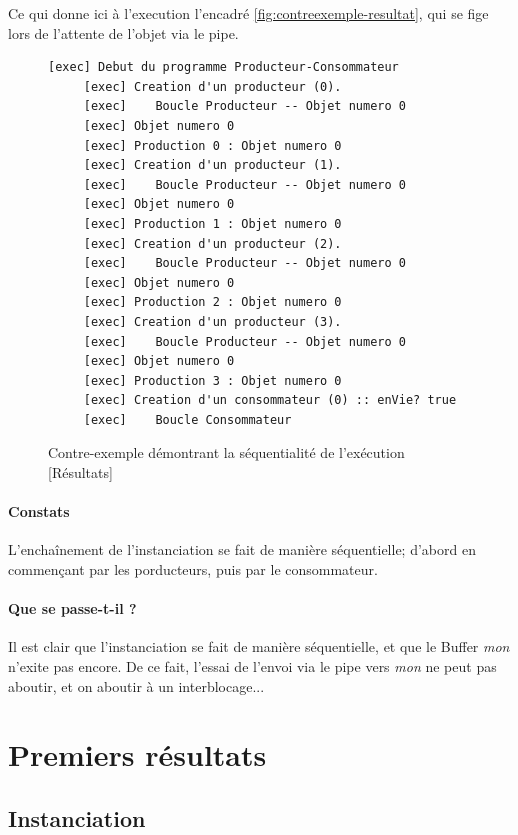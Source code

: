 \documentclass[a4paper,11pt,french]{report}
\begin{document}
Ce qui donne ici à l'execution l'encadré \vref{fig:contreexemple-resultat}, qui se fige lors de l'attente de l'objet via le pipe.

\begin{figure}[h]
\begin{lstlisting}[frame=trBL]
     [exec] Debut du programme Producteur-Consommateur
     [exec] Creation d'un producteur (0).
     [exec]    Boucle Producteur -- Objet numero 0
     [exec] Objet numero 0
     [exec] Production 0 : Objet numero 0
     [exec] Creation d'un producteur (1).
     [exec]    Boucle Producteur -- Objet numero 0
     [exec] Objet numero 0
     [exec] Production 1 : Objet numero 0
     [exec] Creation d'un producteur (2).
     [exec]    Boucle Producteur -- Objet numero 0
     [exec] Objet numero 0
     [exec] Production 2 : Objet numero 0
     [exec] Creation d'un producteur (3).
     [exec]    Boucle Producteur -- Objet numero 0
     [exec] Objet numero 0
     [exec] Production 3 : Objet numero 0
     [exec] Creation d'un consommateur (0) :: enVie? true
     [exec]    Boucle Consommateur
\end{lstlisting}
\caption{Contre-exemple démontrant la séquentialité de l'exécution [Résultats]}
\label{fig:contreexemple-resultat}
\end{figure}

\paragraph{Constats} L'encha\^inement de l'instanciation se fait de manière séquentielle; d'abord en commençant par les porducteurs, puis par le consommateur.

\paragraph{Que se passe-t-il ?} Il est clair que l'instanciation se fait de manière séquentielle, et que le Buffer \textit{mon} n'exite pas encore. De ce fait, l'essai de l'envoi via le pipe vers \textit{mon} ne peut pas aboutir, et on aboutir à un interblocage...

\section{Premiers résultats}
\subsection{Instanciation}
\end{document}
